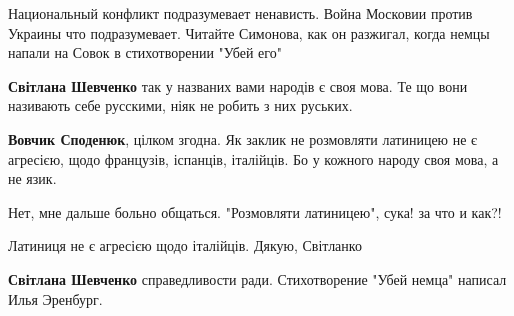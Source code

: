 \begin{itemize}
\begin{itemize}
Национальный конфликт подразумевает ненависть. Война Московии против Украины
что подразумевает. Читайте Симонова, как он разжигал, когда немцы напали на
Совок в стихотворении "Убей его"


 
\textbf{Світлана Шевченко} так у названих вами народів є своя мова. Те що вони
називають себе русскими, ніяк не робить з них руських.

 
\textbf{Вовчик Споденюк}, цілком згодна. Як заклик не розмовляти латиницею не є
агресією, щодо французів, іспанців, італійців. Бо у кожного народу своя мова, а
не язик.

 
Нет, мне дальше больно общаться. "Розмовляти латиницею", сука! за что и как?!

 
Латиниця не є агресією щодо італійців. Дякую, Світланко

 
\textbf{Світлана Шевченко} справедливости ради. Стихотворение "Убей немца" написал Илья Эренбург.

 

\end{itemize}
\end{itemize}
